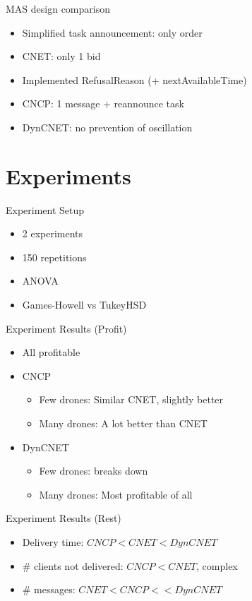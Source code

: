 \documentclass{beamer}
\begin{document}
	\begin{frame}{MAS design comparison}
		\begin{itemize}
			\item Simplified task announcement: only order
			\item CNET: only 1 bid
			\item Implemented RefusalReason (+ nextAvailableTime)
			\item CNCP: 1 message + reannounce task
			\item DynCNET: no prevention of oscillation
		\end{itemize}
	\end{frame}
	
	\section{Experiments}
	\begin{frame}{Experiment Setup}
		\begin{itemize}
			\item 2 experiments
			\item 150 repetitions
			\item ANOVA
			\item Games-Howell vs TukeyHSD
		\end{itemize}
	\end{frame}
	\begin{frame}{Experiment Results (Profit)}
		\begin{itemize}
			\item All profitable
			\item CNCP
				\begin{itemize}
				\item Few drones: Similar CNET, slightly better
				\item Many drones: A lot better than CNET
				\end{itemize}
			\item DynCNET
			\begin{itemize}
				\item Few drones: breaks down
				\item Many drones: Most profitable of all
			\end{itemize}
		\end{itemize}
	\end{frame}
	\begin{frame}{Experiment Results (Rest)}
		\begin{itemize}
			\item Delivery time: $CNCP < CNET < DynCNET$
			\item \# clients not delivered: $CNCP < CNET$, complex
			\item \# messages: $CNET < CNCP << DynCNET$
		\end{itemize}
	\end{frame}
	
\end{document}
